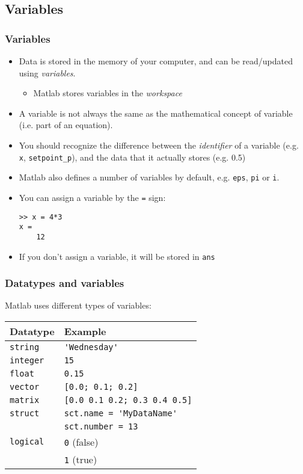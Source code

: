 \documentclass[11pt,table,final,fleqn,xcolor={usenames,dvipsnames},unknownkeysallowed]{beamer}
\begin{document}
\subsection*{Variables}
\begin{frame}[fragile]
 \frametitle{Variables}
  \begin{itemize}
    \item Data is stored in the memory of your computer, and can be read/updated using \emph{variables}.
   \begin{itemize}
      \item Matlab stores variables in the \emph{workspace}
   \end{itemize}
    \item A variable is not always the same as the mathematical concept of variable (i.e. part of an equation).
    \item You should recognize the difference between the \emph{identifier} of a variable (e.g. \lstinline$x$, \lstinline$setpoint_p$), and the data that it actually stores (e.g. 0.5)
    \item Matlab also defines a number of variables by default, e.g. \lstinline$eps$, \lstinline$pi$ or \lstinline$i$.
    \item You can assign a variable by the \lstinline$=$ sign:
   \begin{lstlisting}
>> x = 4*3
x =
    12
   \end{lstlisting}
    \item If you don't assign a variable, it will be stored in \lstinline$ans$
 \end{itemize}
\end{frame}

\begin{frame}[fragile]
 \frametitle{Datatypes and variables}
 Matlab uses different types of variables:
     \begin{longtable}{l!{\vrule}l}
      Datatype        & Example \\ \hline
      \texttt{string} & \lstinline$'Wednesday'$ \\
      \texttt{integer}& \lstinline$15$ \\
      \texttt{float}  & \lstinline$0.15$ \\
      \texttt{vector} & \lstinline$[0.0; 0.1; 0.2]$ \\
      \texttt{matrix} & \lstinline$[0.0 0.1 0.2; 0.3 0.4 0.5]$ \\
      \texttt{struct} & \lstinline$sct.name = 'MyDataName'$ \\
  & \lstinline$sct.number = 13$ \\
 \texttt{logical}& \lstinline$0$ (false)  \\
                      & \lstinline$1$ (true) \\
    \end{longtable}
\end{frame}
\end{document}
